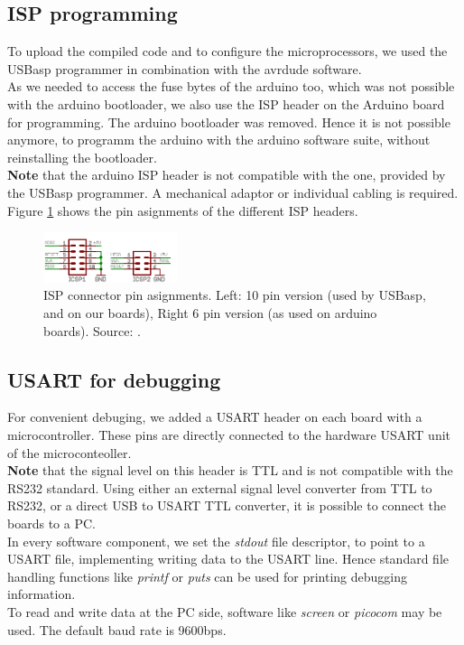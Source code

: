 \documentclass[a4paper]{scrreprt}
\begin{document}
\subsection{ISP programming}
To upload the compiled code and to configure the microprocessors, we used the USBasp programmer in combination with the avrdude software.\\
As we needed to access the fuse bytes of the arduino too, which was not possible with the arduino bootloader, we also use the ISP header on the Arduino board for programming. The arduino bootloader was removed. Hence it is not possible anymore, to programm the arduino with the arduino software suite, without reinstalling the bootloader.\\
\textbf{Note} that the arduino ISP header is not compatible with the one, provided by the USBasp programmer. A mechanical adaptor or individual cabling is required. 
Figure \ref{fig:isp} shows the pin asignments of the different ISP headers.
\begin{figure}[htbp]
	\centering
	\includegraphics[width=0.35\textwidth]{img/isp.png}
  \caption{ISP connector pin asignments. Left: 10 pin version (used by USBasp, and on our boards), Right 6 pin version (as used on arduino boards). Source: \cite{micronet}.}
	\label{fig:isp}
\end{figure}
\subsection{USART for debugging}
For convenient debuging, we added a USART header on each board with a microcontroller. 
These pins are directly connected to the hardware USART unit of the microconteoller.\\ 
\textbf{Note} that the signal level on this header is TTL and is not compatible with the RS232 standard. Using either an external signal level converter from TTL to RS232, or a direct USB to USART TTL converter, it is possible to connect the boards to a PC.\\
In every software component, we set the \emph{stdout} file descriptor, to point to a USART file, implementing writing data to the USART line.
Hence standard file handling functions like \emph{printf} or \emph{puts} can be used for printing debugging information.\\
To read and write data at the PC side, software like \emph{screen} or \emph{picocom} may be used. The default baud rate is 9600bps.
\end{document}
